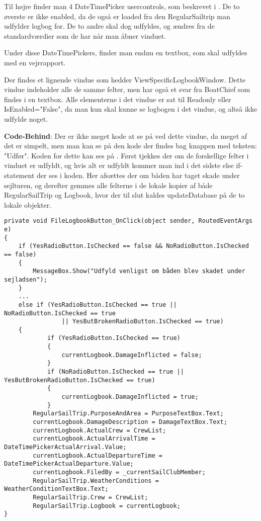 Til højre finder man 4 DateTimePicker usercontrols, som beskrevet i . De to øverste er ikke enabled, da de også er loaded fra den RegularSailtrip man udfylder logbog for. De to andre skal dog udfyldes, og ændres fra de standardværdier som de har når man åbner vinduet. 

Under disse DateTimePickers, finder man endnu en textbox, som skal udfyldes med en vejrrapport.

Der findes et lignende vindue som hedder ViewSpecificLogbookWindow.
Dette vindue indeholder alle de samme felter, men har også et svar fra BoatChief som findes i en textbox.
Alle elementerne i det vindue er sat til Readonly eller IsEnabled="False", da man kun skal kunne se logbogen i det vindue, og altså ikke udfylde noget.


\textbf{Code-Behind}: Der er ikke meget kode at se på ved dette vindue, da meget af det er simpelt, men man kan se på den kode der findes bag knappen med teksten: "Udfør".
Koden for dette kan ses på .
Først tjekkes der om de forskellige felter i vinduet er udfyldt, og hvis alt er udfyldt kommer man ind i det sidste else if-statement der ses i koden. 
Her afsættes der om båden har taget skade under sejlturen, og derefter gemmes alle felterne i de lokale kopier af både RegularSailTrip og Logbook, hvor der til slut kaldes updateDatabase på de to lokale objekter.

\begin{lstlisting}[frame=single, caption= Gem Logbog, label=SaveLogbookButton]
private void FileLogbookButton_OnClick(object sender, RoutedEventArgs e)
{
	if (YesRadioButton.IsChecked == false && NoRadioButton.IsChecked == false)
	{
	    MessageBox.Show("Udfyld venligst om båden blev skadet under sejladsen");
	}
	...
	else if (YesRadioButton.IsChecked == true || NoRadioButton.IsChecked == true
	            || YesButBrokenRadioButton.IsChecked == true) 
	{
	        if (YesRadioButton.IsChecked == true)
	        {
	            currentLogbook.DamageInflicted = false;
	        }      
	        if (NoRadioButton.IsChecked == true || YesButBrokenRadioButton.IsChecked == true)
	        {
	            currentLogbook.DamageInflicted = true;
	        }
	    RegularSailTrip.PurposeAndArea = PurposeTextBox.Text;
	    currentLogbook.DamageDescription = DamageTextBox.Text;
	    currentLogbook.ActualCrew = CrewList;
	    currentLogbook.ActualArrivalTime = DateTimePickerActualArrival.Value;
	    currentLogbook.ActualDepartureTime = DateTimePickerActualDeparture.Value;
	    currentLogbook.FiledBy = _currentSailClubMember;
	    RegularSailTrip.WeatherConditions = WeatherConditionTextBox.Text;
	    RegularSailTrip.Crew = CrewList;
	    RegularSailTrip.Logbook = currentLogbook;
}
\end{lstlisting}


